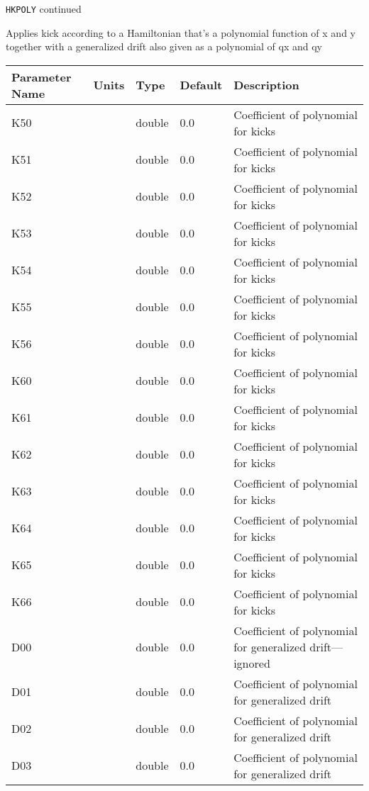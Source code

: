 \newpage
\begin{center}{\Large\verb|HKPOLY| continued}\end{center}
Applies kick according to a Hamiltonian that's a polynomial function of x and y together with a generalized drift also given as a polynomial of qx and qy
\\
\begin{tabular}{|l|l|l|l|p{\descwidth}|} \hline
Parameter Name & Units & Type & Default & Description \\ \hline 
K50 &  & double &  0.0 & Coefficient of polynomial for kicks  \\ \hline 
K51 &  & double &  0.0 & Coefficient of polynomial for kicks  \\ \hline 
K52 &  & double &  0.0 & Coefficient of polynomial for kicks  \\ \hline 
K53 &  & double &  0.0 & Coefficient of polynomial for kicks  \\ \hline 
K54 &  & double &  0.0 & Coefficient of polynomial for kicks  \\ \hline 
K55 &  & double &  0.0 & Coefficient of polynomial for kicks  \\ \hline 
K56 &  & double &  0.0 & Coefficient of polynomial for kicks  \\ \hline 
K60 &  & double &  0.0 & Coefficient of polynomial for kicks  \\ \hline 
K61 &  & double &  0.0 & Coefficient of polynomial for kicks  \\ \hline 
K62 &  & double &  0.0 & Coefficient of polynomial for kicks  \\ \hline 
K63 &  & double &  0.0 & Coefficient of polynomial for kicks  \\ \hline 
K64 &  & double &  0.0 & Coefficient of polynomial for kicks  \\ \hline 
K65 &  & double &  0.0 & Coefficient of polynomial for kicks  \\ \hline 
K66 &  & double &  0.0 & Coefficient of polynomial for kicks  \\ \hline 
D00 &  & double &  0.0 & Coefficient of polynomial for generalized drift---ignored  \\ \hline 
D01 &  & double &  0.0 & Coefficient of polynomial for generalized drift  \\ \hline 
D02 &  & double &  0.0 & Coefficient of polynomial for generalized drift  \\ \hline 
D03 &  & double &  0.0 & Coefficient of polynomial for generalized drift  \\ \hline 
\end{tabular}

